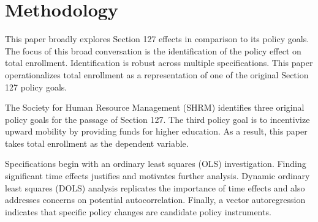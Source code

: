 \documentclass[review]{elsarticle}
\begin{document}
\section{Methodology}

This paper broadly explores Section 127 effects in comparison to its policy goals.
The focus of this broad conversation is the identification of the policy effect on total enrollment.
Identification is robust across multiple specifications.
This paper operationalizes total enrollment as a representation of one of the original Section 127 policy goals.

The Society for Human Resource Management (SHRM) \cite{jones_2010} identifies three original policy goals for the passage of Section 127.
The third policy goal is to incentivize upward mobility by providing funds for higher education.
As a result, this paper takes total enrollment as the dependent variable.

Specifications begin with an ordinary least squares (OLS) investigation.
Finding significant time effects justifies and motivates further analysis.
Dynamic ordinary least squares (DOLS) analysis replicates the importance of time effects and also addresses concerns on potential autocorrelation.
Finally, a vector autoregression indicates that specific policy changes are candidate policy instruments.


\end{document}
